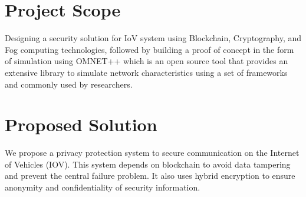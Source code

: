 	\section{Project Scope}
		\label{}
		Designing a security solution for IoV system using Blockchain, Cryptography, and Fog computing technologies, followed by building a proof of concept in the form of simulation using OMNET++ which is an open source tool that provides an extensive library to simulate network characteristics using a set of frameworks and commonly used by researchers. 
		
	\section{Proposed Solution}
		\label{}
		We propose a privacy protection system to secure communication on the Internet of Vehicles (IOV). This system depends on blockchain to avoid data tampering and prevent the central failure problem. It also uses hybrid encryption to ensure anonymity and confidentiality of security information. 
	
